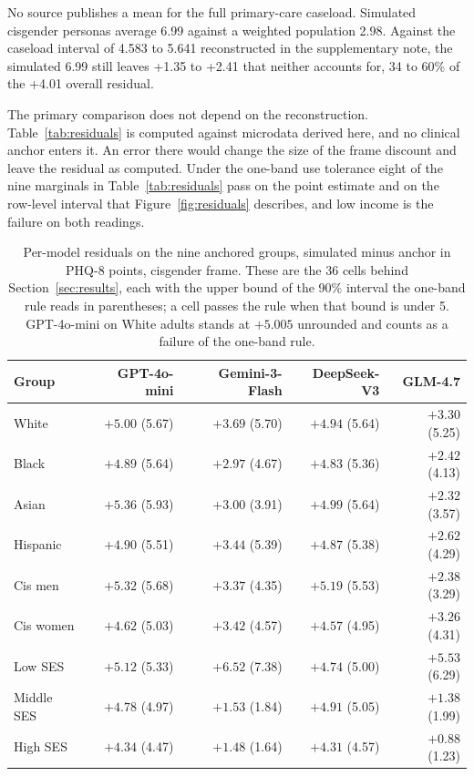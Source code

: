\documentclass[wcp]{jmlr}
\begin{document}
No source publishes a mean for the full primary-care caseload. Simulated cisgender
personas average 6.99 against a weighted population 2.98. Against the caseload interval of 4.583 to 5.641 reconstructed in the
supplementary note, the simulated 6.99 still leaves +1.35 to +2.41 that neither accounts
for, 34 to 60\% of the +4.01 overall residual.

The primary comparison does not depend on the reconstruction. Table~\ref{tab:residuals} is computed against microdata derived here, and no clinical anchor enters it. An error there would change the size of the frame discount and leave the residual as computed. Under the one-band use tolerance eight of the nine marginals in Table~\ref{tab:residuals} pass on the point estimate and on the row-level interval that Figure~\ref{fig:residuals} describes, and low income is the failure on both readings.

\begin{table}[!htb]
\caption{Per-model residuals on the nine anchored groups, simulated minus anchor in PHQ-8 points, cisgender frame. These are the 36 cells behind Section~\ref{sec:results}, each with the upper bound of the 90\% interval the one-band rule reads in parentheses; a cell passes the rule when that bound is under 5. GPT-4o-mini on White adults stands at $+5.005$ unrounded and counts as a failure of the one-band rule.}
\label{tab:permodel}
\footnotesize
\setlength{\tabcolsep}{4pt}
\renewcommand{\arraystretch}{0.92}
\centering
\begin{tabular}{lrrrr}
\toprule
Group & GPT-4o-mini & Gemini-3-Flash & DeepSeek-V3 & GLM-4.7 \\
\midrule
White & $+5.00$ (5.67) & $+3.69$ (5.70) & $+4.94$ (5.64) & $+3.30$ (5.25) \\
Black & $+4.89$ (5.64) & $+2.97$ (4.67) & $+4.83$ (5.36) & $+2.42$ (4.13) \\
Asian & $+5.36$ (5.93) & $+3.00$ (3.91) & $+4.99$ (5.64) & $+2.32$ (3.57) \\
Hispanic & $+4.90$ (5.51) & $+3.44$ (5.39) & $+4.87$ (5.38) & $+2.62$ (4.29) \\
Cis men & $+5.32$ (5.68) & $+3.37$ (4.35) & $+5.19$ (5.53) & $+2.38$ (3.29) \\
Cis women & $+4.62$ (5.03) & $+3.42$ (4.57) & $+4.57$ (4.95) & $+3.26$ (4.31) \\
Low SES & $+5.12$ (5.33) & $+6.52$ (7.38) & $+4.74$ (5.00) & $+5.53$ (6.29) \\
Middle SES & $+4.78$ (4.97) & $+1.53$ (1.84) & $+4.91$ (5.05) & $+1.38$ (1.99) \\
High SES & $+4.34$ (4.47) & $+1.48$ (1.64) & $+4.31$ (4.57) & $+0.88$ (1.23) \\
\bottomrule
\end{tabular}
\end{table}
\end{document}

